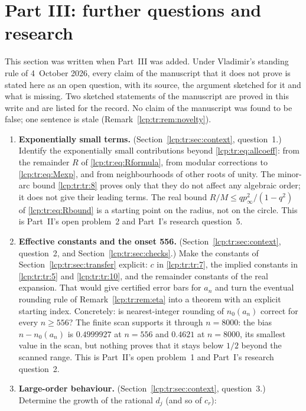 \documentclass[11pt]{article}
\numberwithin{equation}{section}
\theoremstyle{definition}\newtheorem{definition}[theorem]{Definition}
\theoremstyle{remark}\newtheorem{remark}[theorem]{Remark}
\begin{document}
\section{Part III: further questions and research}\label{lcp:tr:sec:further}
This section was written when Part~III was added. Under Vladimir's
standing rule of 4~October 2026, every claim of the manuscript that it does
not prove is stated here as an open question, with its source, the
argument sketched for it and what is missing. Two sketched statements of
the manuscript are proved in this write and are listed for the record. No
claim of the manuscript was found to be false; one sentence is stale
(Remark~\ref{lcp:tr:rem:novelty}).
\begin{enumerate}[leftmargin=*,label=\textbf{\arabic*.},itemsep=0.5em]
\item \textbf{Exponentially small terms.} (Section~\ref{lcp:tr:sec:context},
 question~1.) Identify the exponentially small contributions beyond
 \eqref{lcp:tr:eq:allcoeff}: from the remainder $R$ of
 \eqref{lcp:tr:eq:Rformula}, from modular corrections to
 \eqref{lcp:tr:eq:Mexp}, and from neighbourhoods of other roots of unity.
 The minor-arc bound \eqref{lcp:tr:tr:8} proves only that they do not affect
 any algebraic order; it does not give their leading terms. The real bound
 $R/M\le qp_\infty^2/(1-q^2)$ of \eqref{lcp:tr:eq:Rbound} is a starting
 point on the radius, not on the circle. This is Part~II's open problem~2
 and Part~I's research question~5.
\item \textbf{Effective constants and the onset 556.}
 (Section~\ref{lcp:tr:sec:context}, question~2, and
 Section~\ref{lcp:tr:sec:checks}.) Make the constants of
 Section~\ref{lcp:tr:sec:transfer} explicit: $c$ in \eqref{lcp:tr:tr:7},
 the implied constants in \eqref{lcp:tr:tr:5} and \eqref{lcp:tr:tr:10}, and
 the remainder constants of the real expansion. That would give certified
 error bars for $a_n$ and turn the eventual rounding rule of
 Remark~\ref{lcp:tr:rem:eta} into a theorem with an explicit starting
 index. Concretely: is nearest-integer rounding of $n_0(a_n)$ correct for
 every $n\ge556$? The finite scan supports it through $n=8000$: the bias
 $n-n_0(a_n)$ is $0.4999927$ at $n=556$ and $0.4621$ at $n=8000$, its
 smallest value in the scan, but nothing proves that it stays below $1/2$
 beyond the scanned range. This is Part~II's open
 problem~1 and Part~I's research question~2.
\item \textbf{Large-order behaviour.} (Section~\ref{lcp:tr:sec:context},
 question~3.) Determine the growth of the rational $d_j$ (and so of $c_r$):

\end{enumerate}
\end{document}
